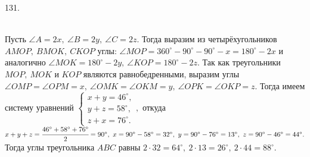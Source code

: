 131. \begin{figure}[ht!]
\end{figure}\\
Пусть $\angle A=2x,\ \angle B=2y,\ \angle C=2z.$ Тогда выразим из четырёхугольников $AMOP,\ BMOK,\ CKOP$ углы: $\angle MOP=360^\circ-90^\circ-90^\circ-x=180^\circ-2x$ и аналогично $\angle MOK=180^\circ-2y,\ \angle KOP=180^\circ-2z.$ Так как треугольники $MOP,\ MOK$ и $KOP$ являются равнобедренными, выразим углы $\angle OMP=\angle OPM=x,\ \angle OMK=\angle OKM=y,\ \angle OPK=\angle OKP=z.$ Тогда имеем систему уравнений $\begin{cases} x+y=46^\circ,\\ y+z=58^\circ,\\ z+x=76^\circ.\end{cases},$ откуда $x+y+z=\cfrac{46^\circ+58^\circ+76^\circ}{2}=90^\circ,\ x=90^\circ-58^\circ=32^\circ,\ y=90^\circ-76^\circ=13^\circ,\ z=90^\circ-46^\circ=44^\circ.$ Тогда углы треугольника $ABC$ равны $2\cdot32=64^\circ,\ 2\cdot13=26^\circ,\ 2\cdot44=88^\circ.$\\
